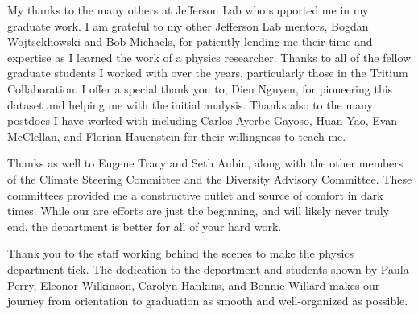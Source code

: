 \documentclass[../main.tex]{subfiles}
\begin{document}
\begin{singlespace}
{{My thanks to the many others at Jefferson Lab who supported me in my graduate work. I am grateful to my other Jefferson Lab mentors, Bogdan Wojtsekhowski and Bob Michaels, for patiently lending me their time and expertise as I learned the work of a physics researcher. Thanks to all of the fellow graduate students I worked with over the years, particularly those in the Tritium Collaboration. I offer a special thank you to, Dien Nguyen, for pioneering this dataset and helping me with the initial analysis. Thanks also to the many postdocs I have worked with including Carlos Ayerbe-Gayoso, Huan Yao, Evan McClellan, and Florian Hauenstein for their willingness to teach me.\\

} %

{\parindent0pt %
                                                                                 
Thanks as well to Eugene Tracy and Seth Aubin, along with the other members of the Climate Steering Committee and the Diversity Advisory Committee. These committees provided me a constructive outlet and source of comfort in dark times. While our are efforts are just the beginning, and will likely never truly end, the department is better for all of your hard work.\\

} %

{\parindent0pt %
                                                                                 
Thank you to the staff working behind the scenes to make the physics department tick. The dedication to the department and students shown by Paula Perry, Eleonor Wilkinson, Carolyn Hankins, and Bonnie Willard makes our journey from orientation to graduation as smooth and well-organized as possible. \\

} %

{\parindent0pt %
                                                                                 
}}
\end{singlespace}
\end{document}
